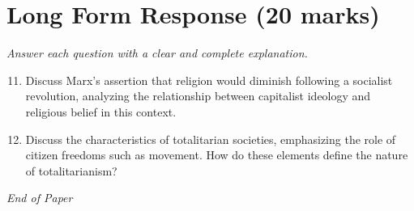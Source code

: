 \documentclass[12pt]{article}
\begin{document}
\section*{Long Form Response (20 marks)}
\textit{Answer each question with a clear and complete explanation.}
\begin{enumerate}[label=\arabic*.]
\setcounter{enumi}{10}
\item Discuss Marx's assertion that religion would diminish following a socialist revolution, analyzing the relationship between capitalist ideology and religious belief in this context.
\item Discuss the characteristics of totalitarian societies, emphasizing the role of citizen freedoms such as movement. How do these elements define the nature of totalitarianism?
\end{enumerate}

\vfill
\noindent\textit{End of Paper}
\end{document}
